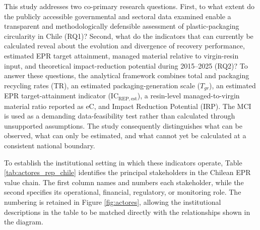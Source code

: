 \documentclass[review,10pt]{elsarticle}
\newcommand{\revpar}[1]{#1\par\medskip}
\newcommand{\changepar}[1]{#1\par\medskip}
\begin{document}
\changepar{This study addresses two co-primary research questions. First, to what extent do the publicly accessible governmental and sectoral data examined enable a transparent and methodologically defensible assessment of plastic-packaging circularity in Chile (RQ1)? Second, what do the indicators that can currently be calculated reveal about the evolution and divergence of recovery performance, estimated EPR target attainment, managed material relative to virgin-resin input, and theoretical impact-reduction potential during 2015--2025 (RQ2)? To answer these questions, the analytical framework combines total and packaging recycling rates (TR), an estimated packaging-generation scale ($T_{gr}$), an estimated EPR target-attainment indicator (IC$_{\mathrm{REP,est}}$), a resin-level managed-to-virgin material ratio reported as eC, and Impact Reduction Potential (IRP). The MCI is used as a demanding data-feasibility test rather than calculated through unsupported assumptions. The study consequently distinguishes what can be observed, what can only be estimated, and what cannot yet be calculated at a consistent national boundary.}

\revpar{To establish the institutional setting in which these indicators operate, Table \ref{tab:actores_rep_chile} identifies the principal stakeholders in the Chilean EPR value chain. The first column names and numbers each stakeholder, while the second specifies its operational, financial, regulatory, or monitoring role. The numbering is retained in Figure \ref{fig:actores}, allowing the institutional descriptions in the table to be matched directly with the relationships shown in the diagram.}
\end{document}
